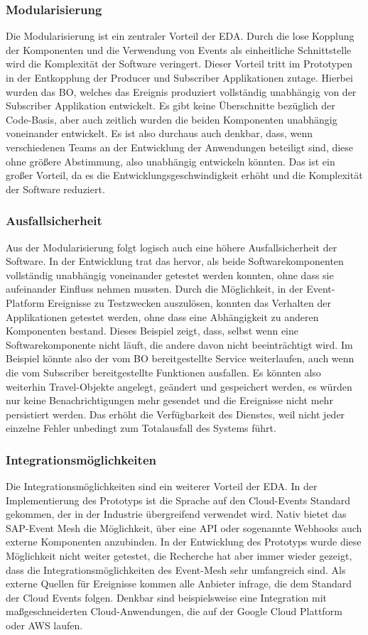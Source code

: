 \subsubsection*{Modularisierung}
Die Modularisierung ist ein zentraler Vorteil der \ac{EDA}. Durch die lose Kopplung der Komponenten und die Verwendung von Events als einheitliche Schnittstelle wird die Komplexität der Software veringert. Dieser Vorteil tritt im Prototypen in der Entkopplung der Producer und Subscriber Applikationen zutage. Hierbei wurden das \ac{BO}, welches das Ereignis produziert vollständig unabhängig von der Subscriber Applikation entwickelt. Es gibt keine Überschnitte bezüglich der Code-Basis, aber auch zeitlich wurden die beiden Komponenten unabhängig voneinander entwickelt. Es ist also durchaus auch denkbar, dass, wenn verschiedenen Teams an der Entwicklung der Anwendungen beteiligt sind, diese ohne größere Abstimmung, also unabhängig entwickeln könnten. Das ist ein großer Vorteil, da es die Entwicklungsgeschwindigkeit erhöht und die Komplexität der Software reduziert.
\subsubsection*{Ausfallsicherheit}
Aus der Modularisierung folgt logisch auch eine höhere Ausfallsicherheit der Software. In der Entwicklung trat das hervor, als beide Softwarekomponenten vollständig unabhängig voneinander getestet werden konnten, ohne dass sie aufeinander Einfluss nehmen mussten. Durch die Möglichkeit, in der Event-Platform Ereignisse zu Testzwecken auszulösen, konnten das Verhalten der Applikationen getestet werden, ohne dass eine Abhängigkeit zu anderen Komponenten bestand. Dieses Beispiel zeigt, dass, selbst wenn eine Softwarekomponente nicht läuft, die andere davon nicht beeinträchtigt wird. Im Beispiel könnte also der vom \ac{BO} bereitgestellte Service weiterlaufen, auch wenn die vom Subscriber bereitgestellte Funktionen ausfallen. Es könnten also weiterhin Travel-Objekte angelegt, geändert und gespeichert werden, es würden nur keine Benachrichtigungen mehr gesendet und die Ereignisse nicht mehr persistiert werden. Das erhöht die Verfügbarkeit des Dienstes, weil nicht jeder einzelne Fehler unbedingt zum Totalausfall des Systems führt.
\subsubsection*{Integrationsmöglichkeiten}
Die Integrationsmöglichkeiten sind ein weiterer Vorteil der \ac{EDA}. In der Implementierung des Prototyps ist die Sprache auf den Cloud-Events Standard gekommen, der in der Industrie übergreifend verwendet wird. Nativ bietet das SAP-Event Mesh die Möglichkeit, über eine API oder sogenannte Webhooks auch externe Komponenten anzubinden. In der Entwicklung des Prototyps wurde diese Möglichkeit nicht weiter getestet, die Recherche hat aber immer wieder gezeigt, dass die Integrationsmöglichkeiten des Event-Mesh sehr umfangreich sind. Als externe Quellen für Ereignisse kommen alle Anbieter infrage, die dem Standard der Cloud Events folgen. Denkbar sind beispielsweise eine Integration mit maßgeschneiderten Cloud-Anwendungen, die auf der Google Cloud Plattform oder AWS laufen.

